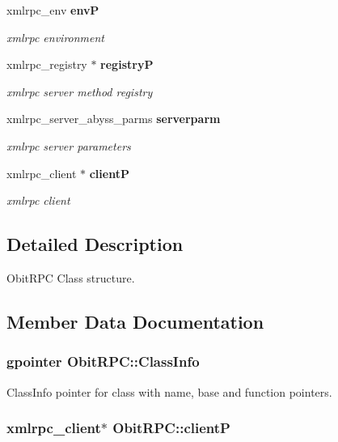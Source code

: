 \begin{CompactItemize}
xmlrpc\_\-env {\bf env\-P}
\begin{CompactList}\small\item\em xmlrpc environment \item\end{CompactList}\item 
xmlrpc\_\-registry $\ast$ {\bf registry\-P}
\begin{CompactList}\small\item\em xmlrpc server method registry \item\end{CompactList}\item 
xmlrpc\_\-server\_\-abyss\_\-parms {\bf serverparm}
\begin{CompactList}\small\item\em xmlrpc server parameters \item\end{CompactList}\item 
xmlrpc\_\-client $\ast$ {\bf client\-P}
\begin{CompactList}\small\item\em xmlrpc client \item\end{CompactList}\end{CompactItemize}


\subsection{Detailed Description}
Obit\-RPC Class structure. 



\subsection{Member Data Documentation}
\subsubsection{\setlength{\rightskip}{0pt plus 5cm}gpointer {\bf Obit\-RPC::Class\-Info}}\label{structObitRPC_o1}


Class\-Info pointer for class with name, base and function pointers. 

\subsubsection{\setlength{\rightskip}{0pt plus 5cm}xmlrpc\_\-client$\ast$ {\bf Obit\-RPC::client\-P}}\label{structObitRPC_o9}


